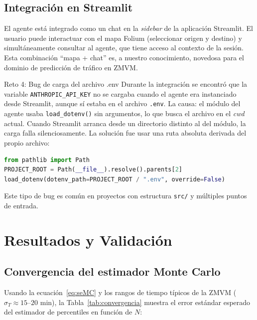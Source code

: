 \documentclass[11pt,a4paper]{article}
\begin{document}
\subsection{Integración en Streamlit}

El agente está integrado como un chat en la \textit{sidebar} de la aplicación Streamlit. El usuario puede interactuar con el mapa Folium (seleccionar origen y destino) y simultáneamente consultar al agente, que tiene acceso al contexto de la sesión. Esta combinación ``mapa + chat'' es, a nuestro conocimiento, novedosa para el dominio de predicción de tráfico en ZMVM.

\begin{challengebox}{Reto 4: Bug de carga del archivo .env}
Durante la integración se encontró que la variable \texttt{ANTHROPIC\_API\_KEY} no se cargaba cuando el agente era instanciado desde Streamlit, aunque sí estaba en el archivo \texttt{.env}. La causa: el módulo del agente usaba \texttt{load\_dotenv()} sin argumentos, lo que busca el archivo en el \textit{cwd} actual. Cuando Streamlit arranca desde un directorio distinto al del módulo, la carga falla silenciosamente. La solución fue usar una ruta absoluta derivada del propio archivo:
\begin{lstlisting}[language=Python,basicstyle=\ttfamily\scriptsize]
from pathlib import Path
PROJECT_ROOT = Path(__file__).resolve().parents[2]
load_dotenv(dotenv_path=PROJECT_ROOT / ".env", override=False)
\end{lstlisting}
Este tipo de bug es común en proyectos con estructura \texttt{src/} y múltiples puntos de entrada.
\end{challengebox}

\section{Resultados y Validación}

\subsection{Convergencia del estimador Monte Carlo}

Usando la ecuación~\eqref{eq:seMC} y los rangos de tiempo típicos de la ZMVM ($\sigma_T \approx 15$--$20$ min), la Tabla~\ref{tab:convergencia} muestra el error estándar esperado del estimador de percentiles en función de $N$:
\end{document}
